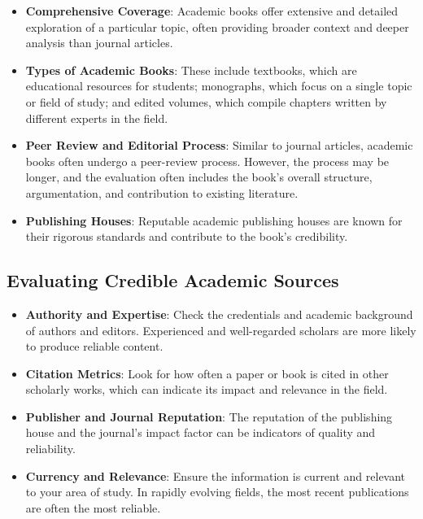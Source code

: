\documentclass[
]{book}
\begin{document}
\begin{itemize}
\item
  \textbf{Comprehensive Coverage}: Academic books offer extensive and detailed exploration of a particular topic, often providing broader context and deeper analysis than journal articles.
\item
  \textbf{Types of Academic Books}: These include textbooks, which are educational resources for students; monographs, which focus on a single topic or field of study; and edited volumes, which compile chapters written by different experts in the field.
\item
  \textbf{Peer Review and Editorial Process}: Similar to journal articles, academic books often undergo a peer-review process. However, the process may be longer, and the evaluation often includes the book's overall structure, argumentation, and contribution to existing literature.
\item
  \textbf{Publishing Houses}: Reputable academic publishing houses are known for their rigorous standards and contribute to the book's credibility.
\end{itemize}

\hypertarget{evaluating-credible-academic-sources}{%
\subsection*{Evaluating Credible Academic Sources}\label{evaluating-credible-academic-sources}}

\begin{itemize}
\item
  \textbf{Authority and Expertise}: Check the credentials and academic background of authors and editors. Experienced and well-regarded scholars are more likely to produce reliable content.
\item
  \textbf{Citation Metrics}: Look for how often a paper or book is cited in other scholarly works, which can indicate its impact and relevance in the field.
\item
  \textbf{Publisher and Journal Reputation}: The reputation of the publishing house and the journal's impact factor can be indicators of quality and reliability.
\item
  \textbf{Currency and Relevance}: Ensure the information is current and relevant to your area of study. In rapidly evolving fields, the most recent publications are often the most reliable.
\end{itemize}
\end{document}
